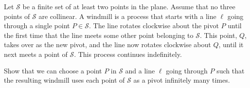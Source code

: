 Let $\mathcal{S}$ be a finite set of at least two points in the plane. Assume that no three points of $\mathcal S$ are collinear. A windmill is a process that starts with a line $\ell$ going through a single point $P \in \mathcal S$. The line rotates clockwise about the pivot $P$ until the first time that the line meets some other point belonging to $\mathcal S$. This point, $Q$,  takes over as the new pivot, and the line now rotates clockwise about $Q$,  until it next meets a point of $\mathcal S$. This process continues indefinitely.

Show that we can choose a point $P$ in $\mathcal S$ and a line $\ell$ going through $P$ such that the resulting windmill uses each point of $\mathcal S$ as a pivot infinitely many times.